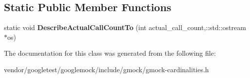 \subsection*{Static Public Member Functions}
\begin{DoxyCompactItemize}
\item 
static void {\bfseries Describe\+Actual\+Call\+Count\+To} (int actual\+\_\+call\+\_\+count,\+::std\+::ostream $\ast$os)\hypertarget{classtesting_1_1Cardinality_aef56c584bc930ea6ace5edc5fb5fd8ac}{}\label{classtesting_1_1Cardinality_aef56c584bc930ea6ace5edc5fb5fd8ac}

\end{DoxyCompactItemize}


The documentation for this class was generated from the following file\+:\begin{DoxyCompactItemize}
\item 
vendor/googletest/googlemock/include/gmock/gmock-\/cardinalities.\+h\end{DoxyCompactItemize}
